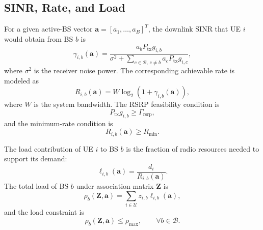 \documentclass[journal]{IEEEtran}
\begin{document}
\subsection{SINR, Rate, and Load}
For a given active-BS vector $\mathbf{a}=[a_1,\ldots,a_B]^T$, the downlink
SINR that UE $i$ would obtain from BS $b$ is
\begin{equation}
    \gamma_{i,b}(\mathbf{a}) =
    \frac{a_b P_{\mathrm{tx}} g_{i,b}}
    {\sigma^2 + \sum_{c\in\mathcal{B},\,c\neq b}
    a_c P_{\mathrm{tx}} g_{i,c}},
    \label{eq:sinr}
\end{equation}
where $\sigma^2$ is the receiver noise power. The corresponding achievable rate
is modeled as
\begin{equation}
    R_{i,b}(\mathbf{a}) =
    W\log_2\left(1+\gamma_{i,b}(\mathbf{a})\right),
    \label{eq:rate}
\end{equation}
where $W$ is the system bandwidth. The RSRP feasibility condition is
\begin{equation}
    P_{\mathrm{tx}} g_{i,b}\geq \Gamma_{\mathrm{rsrp}},
    \label{eq:rsrp}
\end{equation}
and the minimum-rate condition is
\begin{equation}
    R_{i,b}(\mathbf{a})\geq R_{\min}.
    \label{eq:qos}
\end{equation}

The load contribution of UE $i$ to BS $b$ is the fraction of radio resources
needed to support its demand:
\begin{equation}
    \ell_{i,b}(\mathbf{a}) =
    \frac{d_i}{R_{i,b}(\mathbf{a})}.
\end{equation}
The total load of BS $b$ under association matrix $\mathbf{Z}$ is
\begin{equation}
    \rho_b(\mathbf{Z},\mathbf{a}) =
    \sum_{i\in\mathcal{U}} z_{i,b}\ell_{i,b}(\mathbf{a}),
    \label{eq:load}
\end{equation}
and the load constraint is
\begin{equation}
    \rho_b(\mathbf{Z},\mathbf{a})\leq \rho_{\max},
    \qquad \forall b\in\mathcal{B}.
    \label{eq:load_constraint}
\end{equation}
\end{document}
